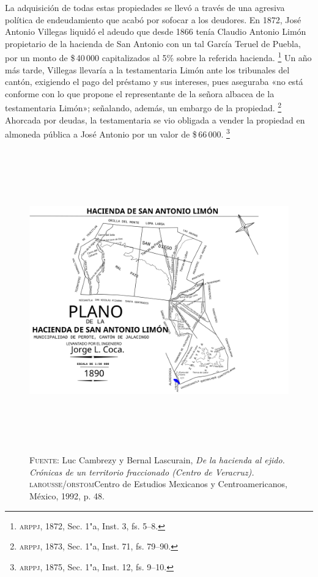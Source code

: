 \documentclass[14pt,twoside,final]{extbook} %
\let\oldfootnote\footnote
\renewcommand\footnote[1]{%
\oldfootnote{\hspace{1mm}#1}}
\begin{document}
La adquisición de todas estas propiedades se llevó a través de una agresiva política de endeudamiento que acabó por sofocar a los deudores. En 1872, José Antonio Villegas liquidó el adeudo que desde 1866 tenía Claudio Antonio Limón propietario de la hacienda de San Antonio con un tal García Teruel de Puebla, por un monto de \$\,40\,000 capitalizados al 5\% sobre la referida hacienda.\footnote{\textsc{arppj}, 1872, Sec. 1"a, Inst. 3, fs. 5--8.} Un año más tarde, Villegas llevaría a la testamentaria Limón ante los tribunales del cantón, exigiendo el pago del préstamo y sus intereses, pues aseguraba «no está conforme con lo que propone el representante de la señora albacea de la testamentaria Limón»; señalando, además, un embargo de la propiedad.\footnote{\textsc{arppj}, 1873, Sec. 1"a, Inst. 71, fs. 79--90.} Ahorcada por deudas, la testamentaria se vio obligada a vender la propiedad en almoneda pública a José Antonio por un valor de \$\,66\,000.\footnote{\textsc{arppj}, 1875, Sec. 1"a, Inst. 12, fs. 9--10.}
\begin{figure}
\centering
\includegraphics[height=13.1cm]{limon} %
\caption[Plano de la hacienda de San Antonio Limón]{\textsc{Fuente:} Luc Cambrezy y Bernal Lascurain, \emph{De la hacienda al ejido. Crónicas de un territorio fraccionado (Centro de Veracruz).} \textsc{larousse/orstom} Centro de Estudios Mexicanos y Centroamericanos, México, 1992, p. 48.}
\label{fig:hda-limon}
\end{figure}
\end{document}

